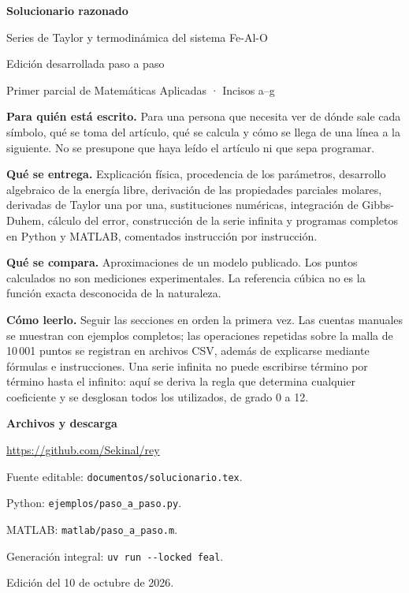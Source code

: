 \documentclass[11pt,a4paper]{article}
\begin{document}
\begin{titlepage}
{\Huge\bfseries\color{azul} Solucionario razonado}\par\bigskip
{\LARGE Series de Taylor y termodinámica del sistema Fe-Al-O}\par\bigskip
{\Large Edición desarrollada paso a paso}\par
Primer parcial de Matemáticas Aplicadas · Incisos a--g\par
\vspace{1cm}
\textbf{Para quién está escrito.} Para una persona que necesita ver de dónde sale cada símbolo, qué se toma del artículo, qué se calcula y cómo se llega de una línea a la siguiente. No se presupone que haya leído el artículo ni que sepa programar.

\textbf{Qué se entrega.} Explicación física, procedencia de los parámetros, desarrollo algebraico de la energía libre, derivación de las propiedades parciales molares, derivadas de Taylor una por una, sustituciones numéricas, integración de Gibbs-Duhem, cálculo del error, construcción de la serie infinita y programas completos en Python y MATLAB, comentados instrucción por instrucción.

\textbf{Qué se compara.} Aproximaciones de un modelo publicado. Los puntos calculados no son mediciones experimentales. La referencia cúbica no es la función exacta desconocida de la naturaleza.

\textbf{Cómo leerlo.} Seguir las secciones en orden la primera vez. Las cuentas manuales se muestran con ejemplos completos; las operaciones repetidas sobre la malla de 10\,001 puntos se registran en archivos CSV, además de explicarse mediante fórmulas e instrucciones. Una serie infinita no puede escribirse término por término hasta el infinito: aquí se deriva la regla que determina cualquier coeficiente y se desglosan todos los utilizados, de grado 0 a 12.

\vfill
\textbf{Archivos y descarga}\par
\url{https://github.com/Sekinal/rey}\par
Fuente editable: \texttt{documentos/solucionario.tex}.\par
Python: \texttt{ejemplos/paso\_a\_paso.py}.\par
MATLAB: \texttt{matlab/paso\_a\_paso.m}.\par
Generación integral: \verb|uv run --locked feal|.\par
Edición del 10 de octubre de 2026.
\end{titlepage}
\tableofcontents








\end{document}
